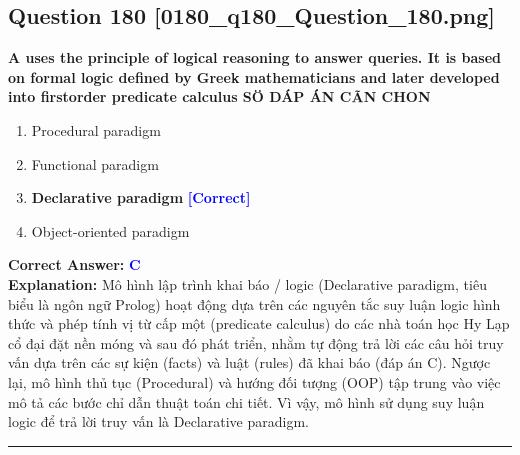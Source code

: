 \documentclass[11pt,a4paper]{article}
\begin{document}
\begin{minipage}{\textwidth}
\subsection*{Question 180 \quad \footnotesize{[0180\_q180\_Question\_180.png]}}
\noindent \textbf{A uses the principle of logical reasoning to answer queries. It is based on formal logic defined by Greek mathematicians and later developed into firstorder predicate calculus SÖ DÁP ÁN CÃN CHON}

\begin{enumerate}[label=\Alph*.]
    \item Procedural paradigm
    \item Functional paradigm
    \item \textbf{Declarative paradigm} \hfill \textcolor{blue}{\textbf{[Correct]}}
    \item Object-oriented paradigm
\end{enumerate}

\noindent \textbf{Correct Answer:} \textcolor{blue}{\textbf{C}} \\[2pt]
\noindent \textbf{Explanation:} Mô hình lập trình khai báo / logic (Declarative paradigm, tiêu biểu là ngôn ngữ Prolog) hoạt động dựa trên các nguyên tắc suy luận logic hình thức và phép tính vị từ cấp một (predicate calculus) do các nhà toán học Hy Lạp cổ đại đặt nền móng và sau đó phát triển, nhằm tự động trả lời các câu hỏi truy vấn dựa trên các sự kiện (facts) và luật (rules) đã khai báo (đáp án C). Ngược lại, mô hình thủ tục (Procedural) và hướng đối tượng (OOP) tập trung vào việc mô tả các bước chỉ dẫn thuật toán chi tiết. Vì vậy, mô hình sử dụng suy luận logic để trả lời truy vấn là Declarative paradigm.

\par\vspace{0.3cm}
\hrule
\vspace{0.3cm}
\end{minipage}
\end{document}

